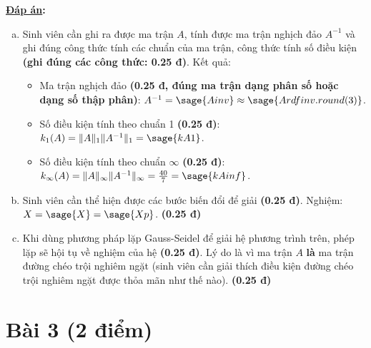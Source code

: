 \documentclass[12pt]{article}
\newcommand{\Solution}{
\medskip
{\bf \underline{Đáp án}:}
}
\begin{document}
\Solution

\begin{enumerate}[a)]
 \item Sinh viên cần ghi ra được ma trận $A$, tính được ma trận nghịch đảo $A^{-1}$ và ghi đúng công thức tính các chuẩn của ma trận, công thức tính số điều kiện \textbf{(ghi đúng các công thức: 0.25 đ)}. Kết quả: 
 \begin{itemize}
  \item Ma trận nghịch đảo \textbf{(0.25 đ, đúng ma trận dạng phân số hoặc dạng số thập phân)}: $A^{-1} = \sage{Ainv} \approx \sage{Ardfinv.round(3)}$.
  \item Số điều kiện tính theo chuẩn 1 \textbf{(0.25 đ)}:  $k_1(A)=\|A\|_1 \|A^{-1}\|_1=\sage{kA1}$.
  \item Số điều kiện tính theo chuẩn $\infty$ \textbf{(0.25 đ)}:  $k_{\infty}(A)=\|A\|_{\infty} \|A^{-1}\|_{\infty}=\frac{40}{7}=\sage{kAinf}$.
 \end{itemize}
 \item Sinh viên cần thể hiện được các bước biến đổi để giải \textbf{(0.25 đ)}. Nghiệm: $X=\sage{X}=\sage{Xp}$. \textbf{(0.25 đ)}
 \item Khi dùng phương pháp lặp Gauss-Seidel để giải hệ phương trình trên, phép lặp sẽ hội tụ về nghiệm của hệ \textbf{(0.25 đ)}. Lý do là vì ma trận $A$ \textbf{là} ma trận đường chéo trội nghiêm ngặt (sinh viên cần giải thích điều kiện đường chéo trội nghiêm ngặt được thỏa mãn như thế nào). \textbf{(0.25 đ)}
\end{enumerate}


\section{Bài 3 (2 điểm)}

\end{document}
